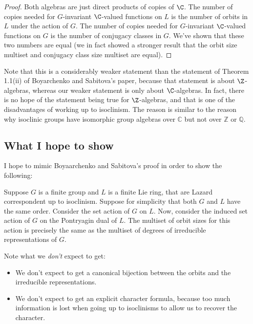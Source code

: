 \begin{proof}
  Both algebras are just direct products of copies of $\C$. The number
  of copies needed for $G$-invariant $\C$-valued functions on $L$ is
  the number of orbits in $L$ under the action of $G$. The number of
  copies needed for $G$-invariant $\C$-valued functions on $G$ is the
  number of conjugacy classes in $G$. We've shown that these two
  numbers are equal (we in fact showed a stronger result that the
  orbit size multiset and conjugacy class size multiset are equal).
\end{proof}

Note that this is a considerably weaker statement than the statement
of Theorem 1.1(ii) of Boyarchenko and Sabitova's paper, because that
statement is about $\Z$-algebras, whereas our weaker statement is only
about $\C$-algebras. In fact, there is no hope of the statement being
true for $\Z$-algebras, and that is one of the disadvantages of
working up to isoclinism. The reason is similar to the reason why
isoclinic groups have isomorphic group algebras over $\mathbb{C}$ but
not over $\mathbb{Z}$ or $\mathbb{Q}$.

\subsection{What I hope to show}

I hope to mimic Boyaarchenko and Sabitova's proof in order to show the
following:

\begin{conjecture}
  Suppose $G$ is a finite group and $L$ is a finite Lie ring, that are
  Lazard correspondent up to isoclinism. Suppose for simplicity that
  both $G$ and $L$ have the same order. Consider the set action of $G$
  on $L$. Now, consider the induced set action of $G$ on the
  Pontryagin dual of $L$. The multiset of orbit sizes for this action
  is precisely the same as the multiset of degrees of irreducible
  representations of $G$.
\end{conjecture}

Note what we {\em don't} expect to get:

\begin{itemize}
\item We don't expect to get a canonical bijection between the orbits
  and the irreducible representations.  
\item We don't expect to get an explicit character formula, because
  too much information is lost when going up to isoclinisms to allow us
  to recover the character.
\end{itemize}
